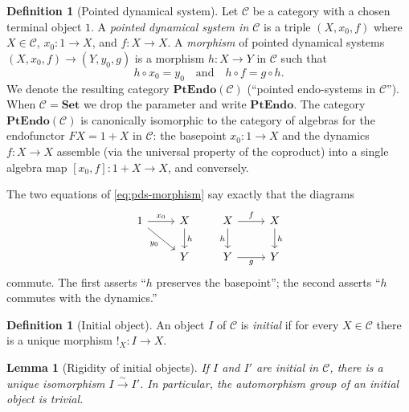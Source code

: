 \documentclass[12pt]{article}
\newtheorem{lemma}[theorem]{Lemma}
\theoremstyle{definition}
\newtheorem{definition}[theorem]{Definition}
\theoremstyle{remark}
\newcommand{\Set}{\mathbf{Set}}
\newcommand{\PtEndo}{\mathbf{PtEndo}}
\begin{document}
\begin{definition}[Pointed dynamical system]
\label{def:pds}
Let $\mathcal{C}$ be a category with a chosen terminal object $1$. A \emph{pointed dynamical system in $\mathcal{C}$} is a triple $(X, x_0, f)$ where $X \in \mathcal{C}$, $x_0 \colon 1 \to X$, and $f \colon X \to X$. A \emph{morphism} of pointed dynamical systems $(X, x_0, f) \to (Y, y_0, g)$ is a morphism $h \colon X \to Y$ in $\mathcal{C}$ such that
\begin{equation}
h \circ x_0 = y_0 \quad \text{and} \quad h \circ f = g \circ h.
\label{eq:pds-morphism}
\end{equation}
We denote the resulting category $\PtEndo(\mathcal{C})$ (``pointed endo-systems in $\mathcal{C}$''). When $\mathcal{C} = \Set$ we drop the parameter and write $\PtEndo$. The category $\PtEndo(\mathcal{C})$ is canonically isomorphic to the category of algebras for the endofunctor $F X = 1 + X$ in $\mathcal{C}$: the basepoint $x_0 \colon 1 \to X$ and the dynamics $f \colon X \to X$ assemble (via the universal property of the coproduct) into a single algebra map $[x_0, f] \colon 1 + X \to X$, and conversely.
\end{definition}

The two equations of \eqref{eq:pds-morphism} say exactly that the diagrams
\[
\begin{tikzcd}
1 \arrow[r, "x_0"] \arrow[dr, "y_0"'] & X \arrow[d, "h"] \\
& Y
\end{tikzcd}
\qquad
\begin{tikzcd}
X \arrow[r, "f"] \arrow[d, "h"'] & X \arrow[d, "h"] \\
Y \arrow[r, "g"'] & Y
\end{tikzcd}
\]
commute. The first asserts ``$h$ preserves the basepoint''; the second asserts ``$h$ commutes with the dynamics.''

\begin{definition}[Initial object]
An object $I$ of $\mathcal{C}$ is \emph{initial} if for every $X \in \mathcal{C}$ there is a unique morphism $!_X \colon I \to X$.
\end{definition}

\begin{lemma}[Rigidity of initial objects]
\label{lem:initial-rigid}
If $I$ and $I'$ are initial in $\mathcal{C}$, there is a unique isomorphism $I \xrightarrow{\sim} I'$. In particular, the automorphism group of an initial object is trivial.
\end{lemma}
\end{document}

